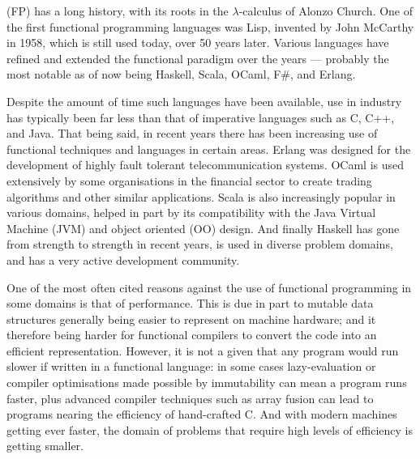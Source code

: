  (FP) has a long history, with its roots in the $\lambda$-calculus of Alonzo Church. One of the first functional programming languages was Lisp, invented by John McCarthy in 1958, which is still used today, over 50 years later. Various languages have refined and extended the functional paradigm over the years --- probably the most notable as of now being Haskell, Scala, OCaml, F\#, and Erlang.

Despite the amount of time such languages have been available, use in industry has typically been far less than that of imperative languages such as C, C++, and Java. That being said, in recent years there has been increasing use of functional techniques and languages in certain areas. Erlang was designed for the development of highly fault tolerant telecommunication systems.\cite[-1em]{armstrong2007history} OCaml is used extensively by some organisations in the financial sector to create trading algorithms and other similar applications. Scala is also increasingly popular in various domains, helped in part by its compatibility with the Java Virtual Machine (JVM) and object oriented (OO) design. And finally Haskell has gone from strength to strength in recent years, is used in diverse problem domains, and has a very active development community.

One of the most often cited reasons against the use of functional programming in some domains is that of performance. This is due in part to mutable data structures generally being easier to represent on machine hardware; and it therefore being harder for functional compilers to convert the code into an efficient representation. However, it is not a given that any program would run slower if written in a functional language: in some cases lazy-evaluation or compiler optimisations made possible by immutability can mean a program runs faster, plus advanced compiler techniques such as array fusion can lead to programs nearing the efficiency of hand-crafted C. And with modern machines getting ever faster, the domain of problems that require high levels of efficiency is getting smaller.

